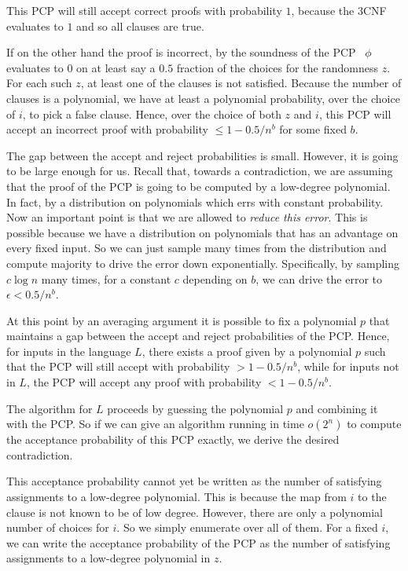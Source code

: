 \documentclass[11pt]{article}
\newcommand{\e}{\epsilon}
\begin{document}
This PCP will still accept correct proofs with probability $1$, because
the 3CNF evaluates to $1$ and so all clauses are true.

If on the other hand the proof is incorrect, by the soundness of the
PCP~\cite{Ben-SassonV-AC0PCP} $\phi$ evaluates to $0$ on at least
say a $0.5$ fraction of the choices for the randomness $z$. For
each such $z$, at least one of the clauses is not satisfied. Because
the number of clauses is a polynomial, we have at least a polynomial
probability, over the choice of $i$, to pick a false clause. Hence,
over the choice of both $z$ and $i$, this PCP will accept an incorrect
proof with probability $\le1-0.5/n^{b}$ for some fixed $b$.

The gap between the accept and reject probabilities is small. However,
it is going to be large enough for us. Recall that, towards a contradiction,
we are assuming that the proof of the PCP is going to be computed
by a low-degree polynomial. In fact, by a distribution on polynomials
which errs with constant probability. Now an important point is that
we are allowed to \emph{reduce this error}. This is possible because
we have a distribution on polynomials that has an advantage on every
fixed input. So we can just sample many times from the distribution
and compute majority to drive the error down exponentially. Specifically,
by sampling $c\log n$ many times, for a constant $c$ depending on
$b$, we can drive the error to $\e<0.5/n^{b}$.

At this point by an averaging argument it is possible to fix a polynomial
$p$ that maintains a gap between the accept and reject probabilities
of the PCP. Hence, for inputs in the language $L$, there exists a
proof given by a polynomial $p$ such that the PCP will still accept
with probability $>1-0.5/n^{b}$, while for inputs not in $L$, the
PCP will accept any proof with probability $<1-0.5/n^{b}$.

The algorithm for $L$ proceeds by guessing the polynomial $p$ and
combining it with the PCP. So if we can give an algorithm running
in time $o(2^{n})$ to compute the acceptance probability of this
PCP exactly, we derive the desired contradiction.

This acceptance probability cannot yet be written as the number of
satisfying assignments to a low-degree polynomial. This is because
the map from $i$ to the clause is not known to be of low degree.
However, there are only a polynomial number of choices for $i$. So
we simply enumerate over all of them. For a fixed $i$, we can write
the acceptance probability of the PCP as the number of satisfying
assignments to a low-degree polynomial in $z$.
\end{document}
